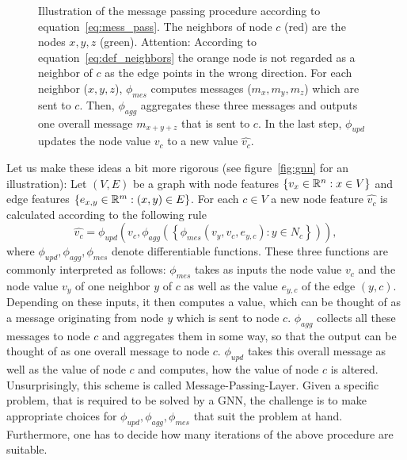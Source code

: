 \begin{SCfigure}[1][h]
\caption{Illustration of the message passing procedure according to equation~\eqref{eq:mess_pass}. 
The neighbors of node $c$ (red) are the nodes $x,y,z$ (green). Attention: According to equation~\eqref{eq:def_neighbors} the orange node is not regarded as a neighbor of $c$ as the edge points in the wrong direction.
For each neighbor ($x,y,z$), $\phi_{mes}$ computes messages ($m_x,m_y,m_z$) which are sent to $c$.
Then, $\phi_{agg}$ aggregates these three messages and outputs one overall message $m_{x+y+z}$ that is sent to $c$. 
In the last step, $\phi_{upd}$ updates the node value $v_c$ to a new value $\widehat{v_c}$.  
}
\end{SCfigure}
Let us make these ideas a bit more rigorous (see figure~\ref{fig:gnn} for an illustration):  
Let $(V,E)$ be a graph with node features $\{v_x\in\mathbb{R}^n : x\in V\}$ and edge features $\{e_{x,y}\in\mathbb{R}^m:(x,y)\in E\}$.
For each $c\in V$ a new node feature $\widehat{v_c}$ is calculated according to the following rule
\begin{equation}
    \label{eq:mess_pass}
    \widehat{v_c}=\phi_{upd}\left(
        v_c, \phi_{agg}\left(\left\{
            \phi_{mes}\left(v_y,v_c, e_{y,c}\right):y\in N_c
            \right\}\right)
    \right),
\end{equation}
where $\phi_{upd},\phi_{agg},\phi_{mes}$ denote differentiable functions. These three functions are commonly interpreted as follows:
$\phi_{mes}$ takes as inputs the node value $v_c$ and the node value $v_y$ of one neighbor $y$ of $c$ as well as the value $e_{y,c}$ of the edge $(y,c)$. 
Depending on these inputs, it then computes a value, which can be thought of as a message originating from node $y$ which is sent to node $c$.
$\phi_{agg}$ collects all these messages to node $c$ and aggregates them in some way, so that the output can be thought of as one overall message to node $c$.
$\phi_{upd}$ takes this overall message as well as the value of node $c$ and computes, how the value of node $c$ is altered.
Unsurprisingly, this scheme is called Message-Passing-Layer. Given a specific problem, that is required to be solved by a GNN, the challenge is to make appropriate choices
for $\phi_{upd},\phi_{agg},\phi_{mes}$ that suit the problem at hand. Furthermore, one has to decide how many iterations of the above procedure are suitable.